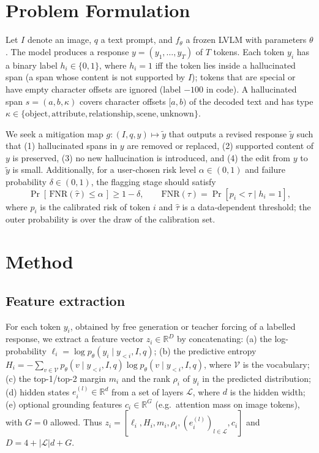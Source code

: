 \documentclass[11pt]{article}
\newcommand{\R}{\mathbb{R}}
\begin{document}
\section{Problem Formulation}
\label{sec:problem}
Let $I$ denote an image, $q$ a text prompt, and $f_\theta$ a frozen LVLM with parameters $\theta$. The model produces a response $y = (y_1,\dots,y_T)$ of $T$ tokens. Each token $y_i$ has a binary label $h_i \in \{0,1\}$, where $h_i=1$ iff the token lies inside a hallucinated span (a span whose content is not supported by $I$); tokens that are special or have empty character offsets are ignored (label $-100$ in code). A hallucinated span $s=(a,b,\kappa)$ covers character offsets $[a,b)$ of the decoded text and has type $\kappa \in \{\text{object},\text{attribute},\text{relationship},\text{scene},\text{unknown}\}$.

We seek a mitigation map $g: (I,q,y) \mapsto \tilde y$ that outputs a revised response $\tilde y$ such that (1) hallucinated spans in $y$ are removed or replaced, (2) supported content of $y$ is preserved, (3) no new hallucination is introduced, and (4) the edit from $y$ to $\tilde y$ is small. Additionally, for a user-chosen risk level $\alpha\in(0,1)$ and failure probability $\delta\in(0,1)$, the flagging stage should satisfy
\begin{equation}
\Pr\!\left[\,\mathrm{FNR}(\hat\tau) \le \alpha\,\right] \ge 1-\delta,\qquad
\mathrm{FNR}(\tau) = \Pr\!\left[p_i < \tau \mid h_i = 1\right],
\label{eq:risk}
\end{equation}
where $p_i$ is the calibrated risk of token $i$ and $\hat\tau$ is a data-dependent threshold; the outer probability is over the draw of the calibration set.

\section{Method}
\label{sec:method}

\subsection{Feature extraction}
For each token $y_i$, obtained by free generation or teacher forcing of a labelled response, we extract a feature vector $z_i\in\R^D$ by concatenating:
(a) the log-probability $\ell_i = \log p_\theta(y_i \mid y_{<i}, I, q)$;
(b) the predictive entropy $H_i = -\sum_{v\in\mathcal V} p_\theta(v\mid y_{<i},I,q)\log p_\theta(v\mid y_{<i},I,q)$, where $\mathcal V$ is the vocabulary;
(c) the top-1/top-2 margin $m_i$ and the rank $\rho_i$ of $y_i$ in the predicted distribution;
(d) hidden states $e_i^{(l)}\in\R^{d}$ from a set of layers $\mathcal L$, where $d$ is the hidden width;
(e) optional grounding features $c_i\in\R^G$ (e.g.\ attention mass on image tokens), with $G=0$ allowed.
Thus $z_i = [\ell_i, H_i, m_i, \rho_i, (e_i^{(l)})_{l\in\mathcal L}, c_i]$ and $D = 4 + |\mathcal L|d + G$.
\end{document}
